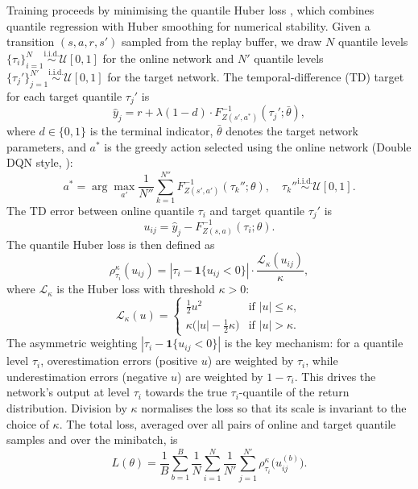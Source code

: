 \documentclass[11pt]{article}
\begin{document}
Training proceeds by minimising the quantile Huber loss \citet{dabney2018implicit}, which combines quantile regression with Huber smoothing for numerical stability. Given a transition $(s, a, r, s')$ sampled from the replay buffer, we draw $N$ quantile levels $\{\tau_i\}_{i=1}^N \overset{\text{i.i.d.}}{\sim} \mathcal{U}[0,1]$ for the online network and $N'$ quantile levels $\{\tau_j'\}_{j=1}^{N'} \overset{\text{i.i.d.}}{\sim} \mathcal{U}[0,1]$ for the target network. The temporal-difference (TD) target for each target quantile $\tau_j'$ is
\begin{equation}\label{eq:td_target}
    \hat{y}_j = r + \lambda(1 - d) \cdot F_{Z(s',a^*)}^{-1}(\tau_j';\bar{\theta}),
\end{equation}
where $d \in \{0,1\}$ is the terminal indicator, $\bar{\theta}$ denotes the target network parameters, and $a^*$ is the greedy action selected using the online network (Double DQN style, \citealp{van2016deep}):
\begin{equation}\label{eq:greedy_action}
    a^* = \arg\max_{a'} \frac{1}{N''} \sum_{k=1}^{N''} F_{Z(s',a')}^{-1}(\tau_k'';\theta), \quad \tau_k'' \overset{\text{i.i.d.}}{\sim} \mathcal{U}[0,1].
\end{equation}
The TD error between online quantile $\tau_i$ and target quantile $\tau_j'$ is
\begin{equation}\label{eq:td_error}
    u_{ij} = \hat{y}_j - F_{Z(s,a)}^{-1}(\tau_i;\theta).
\end{equation}
The quantile Huber loss is then defined as
\begin{equation}\label{eq:quantile_huber}
    \rho_{\tau_i}^{\kappa}(u_{ij}) = |\tau_i - \mathbf{1}\{u_{ij} < 0\}| \cdot \frac{\mathcal{L}_\kappa(u_{ij})}{\kappa},
\end{equation}
where $\mathcal{L}_\kappa$ is the Huber loss with threshold $\kappa > 0$:
\begin{equation}\label{eq:huber}
    \mathcal{L}_\kappa(u) = 
    \begin{cases}
        \tfrac{1}{2}u^2 & \text{if } |u| \leq \kappa, \\[4pt]
        \kappa\bigl(|u| - \tfrac{1}{2}\kappa\bigr) & \text{if } |u| > \kappa.
    \end{cases}
\end{equation}
The asymmetric weighting $|\tau_i - \mathbf{1}\{u_{ij} < 0\}|$ is the key mechanism: for a quantile level $\tau_i$, overestimation errors (positive $u$) are weighted by $\tau_i$, while underestimation errors (negative $u$) are weighted by $1 - \tau_i$. This drives the network's output at level $\tau_i$ towards the true $\tau_i$-quantile of the return distribution. Division by $\kappa$ normalises the loss so that its scale is invariant to the choice of $\kappa$. The total loss, averaged over all pairs of online and target quantile samples and over the minibatch, is
\begin{equation}\label{eq:total_loss}
    L(\theta) = \frac{1}{B} \sum_{b=1}^{B} \frac{1}{N} \sum_{i=1}^{N} \frac{1}{N'} \sum_{j=1}^{N'} \rho_{\tau_i}^{\kappa}\!\bigl(u_{ij}^{(b)}\bigr).
\end{equation}
\end{document}
